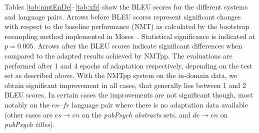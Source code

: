 \documentclass[a4paper,11pt]{article}
\newcommand{\mc}[3]{\multicolumn{#1}{#2}{#3}}
\begin{document}
\begin{table}
	\caption{BLEU scores for the different systems used to domain-adapt the general NMT system for the phsycological domain German--English. Arrows mark statistical significance (see text) and best results on each test set are shown in bold (in case of significant improvements).}
	\label{tab:nmtEnDe}               
\end{table}

% 

Tables \ref{tab:nmtEnDe}--\ref{tab:xfr} show the BLEU scores for the different systems and language pairs. Arrows before BLEU scores represent significant changes with respect to the baseline performance (NMT) as calculated by the bootstrap resampling method implemented in Moses~\cite{koehn04}. Statistical significance is indicated at $p=0.005$. Arrows after the BLEU scores indicate significant differences when compared to the adapted results achieved by NMTpp. The evaluations are performed after 1 and 4 epochs of adaptation respectively, depending on the test set as described above. With the NMTpp system on the in-domain data, we obtain significant improvement in all cases, that generally lies between 1 and 2 BLEU scores. In certain cases the improvements are not significant though, most notably on the $en$--$fr$ language pair where there is no adaptation data available (other cases are $es\rightarrow en$ on the \textit{pubPsych abstracts} sets, and $de\rightarrow en$ on \textit{pubPsych titles}). 
\end{document}
